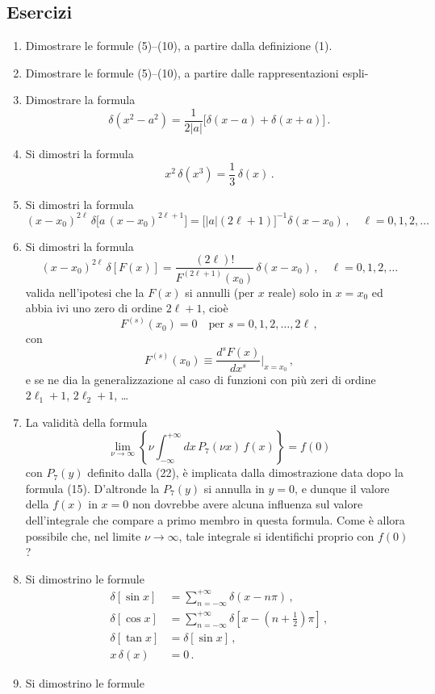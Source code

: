 \documentclass[11pt, a4paper]{book}
\numberwithin{equation}{section}
\newenvironment{esercizi}{\subsection*{Esercizi}\begin{enumerate}}{\end{enumerate}}
\begin{document}
\begin{esercizi}
\item Dimostrare le formule (5)--(10), a partire dalla definizione (1).
\item Dimostrare le formule (5)--(10), a partire dalle rappresentazioni espli-%
\item Dimostrare la formula
\[
\delta(x^2 - a^2) = \frac{1}{2|a|}\bigl[\delta(x-a) + \delta(x+a)\bigr] \,.
\]
\item Si dimostri la formula
\[
x^2\,\delta(x^3) = \frac{1}{3}\,\delta(x) \,.
\]
\item Si dimostri la formula
\[
(x - x_0)^{2\ell}\,\delta\bigl[a\,(x-x_0)^{2\ell+1}\bigr] = \bigl[|a|(2\ell+1)\bigr]^{-1}\delta(x - x_0) \,, \quad \ell = 0, 1, 2, \ldots
\]
\item Si dimostri la formula
\[
(x - x_0)^{2\ell}\,\delta[F(x)] = \frac{(2\ell)!}{F^{(2\ell+1)}(x_0)}\,\delta(x - x_0) \,, \quad \ell = 0, 1, 2, \ldots
\]
valida nell'ipotesi che la $F(x)$ si annulli (per $x$ reale) solo in $x = x_0$ ed abbia ivi uno zero di ordine $2\ell + 1$, cioè
\[
F^{(s)}(x_0) = 0 \quad \text{per } s = 0, 1, 2, \ldots, 2\ell \,,
\]
con
\[
F^{(s)}(x_0) \equiv \frac{d^s F(x)}{dx^s}\bigg|_{x = x_0} \,,
\]
e se ne dia la generalizzazione al caso di funzioni con più zeri di ordine $2\ell_1 + 1$, $2\ell_2 + 1$, \ldots
\item La validità della formula
\[
\lim_{\nu \to \infty} \left\{ \nu \int_{-\infty}^{+\infty} dx\, P_7(\nu x)\, f(x) \right\} = f(0)
\]
con $P_7(y)$ definito dalla (22), è implicata dalla dimostrazione data dopo la formula (15). D'altronde la $P_7(y)$ si annulla in $y = 0$, e dunque il valore della $f(x)$ in $x = 0$ non dovrebbe avere alcuna influenza sul valore dell'integrale che compare a primo membro in questa formula. Come è allora possibile che, nel limite $\nu \to \infty$, tale integrale si identifichi proprio con $f(0)$?
\item Si dimostrino le formule
\begin{align*}
\delta[\sin x] &= \sum_{n=-\infty}^{+\infty} \delta(x - n\pi) \,, \\
\delta[\cos x] &= \sum_{n=-\infty}^{+\infty} \delta\!\left[x - \left(n + \tfrac{1}{2}\right)\pi\right] \,, \\
\delta[\tan x] &= \delta[\sin x] \,, \\
x\,\delta(x) &= 0 \,.
\end{align*}
\item Si dimostrino le formule
\begin{align*}

\end{align*}
\end{esercizi}
\end{document}
